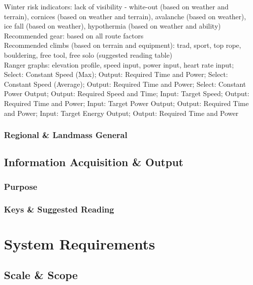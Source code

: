 \documentclass[11pt, english]{article}
\begin{document}
		Winter risk indicators: lack of visibility - white-out (based on weather and terrain), cornices (based on weather and terrain), avalanche (based on weather), ice fall (based on weather), hypothermia (based on weather and ability)\\

		Recommended gear: based on all route factors\\

		Recommended climbs (based on terrain and equipment): trad, sport, top rope, bouldering, free tool, free solo (suggested reading table)\\

		Ranger graphs: elevation profile, speed input, power input, heart rate input; Select: Constant Speed (Max); Output: Required Time and Power; Select: Constant Speed (Average); Output: Required Time and Power; Select: Constant Power Output; Output: Required Speed and Time; Input: Target Speed; Output: Required Time and Power; Input: Target Power Output; Output: Required Time and Power; Input: Target Energy Output; Output: Required Time and Power

		\subsubsection{Regional \& Landmass General}

	\subsection{Information Acquisition \& Output}

		\subsubsection{Purpose}

		\subsubsection{Keys \& Suggested Reading}

\newpage

\section{System Requirements}\label{ch4}

	\subsection{Scale \& Scope}
\end{document}
